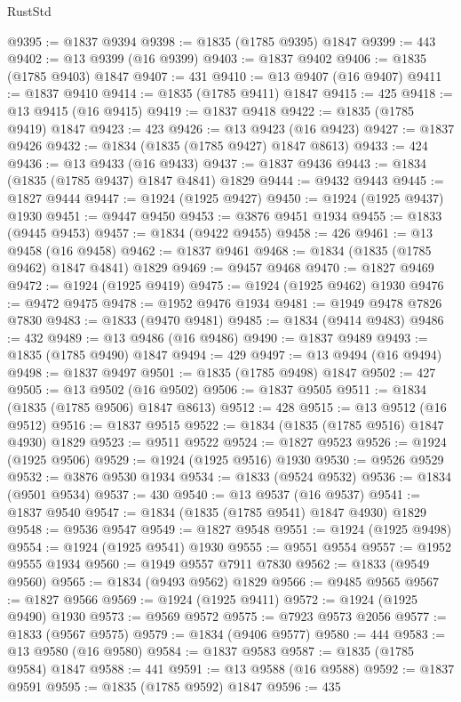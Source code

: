 \begin{lexlean}{RustStd}
\begin{coremodule}
@9395 := @1837 @9394
@9398 := @1835 (@1785 @9395) @1847
@9399 := 443
@9402 := @13 @9399 (@16 @9399)
@9403 := @1837 @9402
@9406 := @1835 (@1785 @9403) @1847
@9407 := 431
@9410 := @13 @9407 (@16 @9407)
@9411 := @1837 @9410
@9414 := @1835 (@1785 @9411) @1847
@9415 := 425
@9418 := @13 @9415 (@16 @9415)
@9419 := @1837 @9418
@9422 := @1835 (@1785 @9419) @1847
@9423 := 423
@9426 := @13 @9423 (@16 @9423)
@9427 := @1837 @9426
@9432 := @1834 (@1835 (@1785 @9427) @1847 @8613)
@9433 := 424
@9436 := @13 @9433 (@16 @9433)
@9437 := @1837 @9436
@9443 := @1834 (@1835 (@1785 @9437) @1847 @4841) @1829
@9444 := @9432 @9443
@9445 := @1827 @9444
@9447 := @1924 (@1925 @9427)
@9450 := @1924 (@1925 @9437) @1930
@9451 := @9447 @9450
@9453 := @3876 @9451 @1934
@9455 := @1833 (@9445 @9453)
@9457 := @1834 (@9422 @9455)
@9458 := 426
@9461 := @13 @9458 (@16 @9458)
@9462 := @1837 @9461
@9468 := @1834 (@1835 (@1785 @9462) @1847 @4841) @1829
@9469 := @9457 @9468
@9470 := @1827 @9469
@9472 := @1924 (@1925 @9419)
@9475 := @1924 (@1925 @9462) @1930
@9476 := @9472 @9475
@9478 := @1952 @9476 @1934
@9481 := @1949 @9478 @7826 @7830
@9483 := @1833 (@9470 @9481)
@9485 := @1834 (@9414 @9483)
@9486 := 432
@9489 := @13 @9486 (@16 @9486)
@9490 := @1837 @9489
@9493 := @1835 (@1785 @9490) @1847
@9494 := 429
@9497 := @13 @9494 (@16 @9494)
@9498 := @1837 @9497
@9501 := @1835 (@1785 @9498) @1847
@9502 := 427
@9505 := @13 @9502 (@16 @9502)
@9506 := @1837 @9505
@9511 := @1834 (@1835 (@1785 @9506) @1847 @8613)
@9512 := 428
@9515 := @13 @9512 (@16 @9512)
@9516 := @1837 @9515
@9522 := @1834 (@1835 (@1785 @9516) @1847 @4930) @1829
@9523 := @9511 @9522
@9524 := @1827 @9523
@9526 := @1924 (@1925 @9506)
@9529 := @1924 (@1925 @9516) @1930
@9530 := @9526 @9529
@9532 := @3876 @9530 @1934
@9534 := @1833 (@9524 @9532)
@9536 := @1834 (@9501 @9534)
@9537 := 430
@9540 := @13 @9537 (@16 @9537)
@9541 := @1837 @9540
@9547 := @1834 (@1835 (@1785 @9541) @1847 @4930) @1829
@9548 := @9536 @9547
@9549 := @1827 @9548
@9551 := @1924 (@1925 @9498)
@9554 := @1924 (@1925 @9541) @1930
@9555 := @9551 @9554
@9557 := @1952 @9555 @1934
@9560 := @1949 @9557 @7911 @7830
@9562 := @1833 (@9549 @9560)
@9565 := @1834 (@9493 @9562) @1829
@9566 := @9485 @9565
@9567 := @1827 @9566
@9569 := @1924 (@1925 @9411)
@9572 := @1924 (@1925 @9490) @1930
@9573 := @9569 @9572
@9575 := @7923 @9573 @2056
@9577 := @1833 (@9567 @9575)
@9579 := @1834 (@9406 @9577)
@9580 := 444
@9583 := @13 @9580 (@16 @9580)
@9584 := @1837 @9583
@9587 := @1835 (@1785 @9584) @1847
@9588 := 441
@9591 := @13 @9588 (@16 @9588)
@9592 := @1837 @9591
@9595 := @1835 (@1785 @9592) @1847
@9596 := 435

\end{coremodule}
\end{lexlean}

